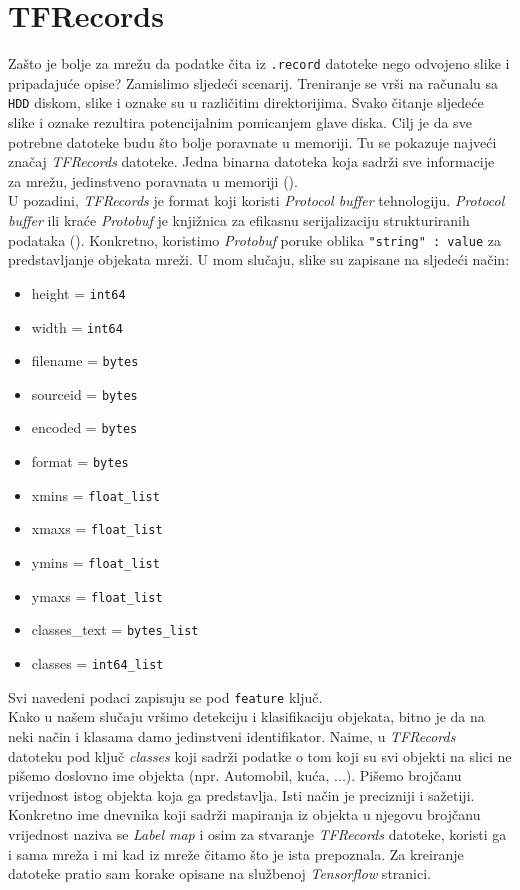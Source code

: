 \section{TFRecords}
Zašto je bolje za mrežu da podatke čita iz \texttt{.record} datoteke nego odvojeno slike i pripadajuće opise?
Zamislimo sljedeći scenarij.
Treniranje se vrši na računalu sa \texttt{HDD} diskom, slike i oznake su u različitim direktorijima.
Svako čitanje sljedeće slike i oznake rezultira potencijalnim pomicanjem glave diska.
Cilj je da sve potrebne datoteke budu što bolje poravnate u memoriji.
Tu se pokazuje najveći značaj \emph{TFRecords} datoteke. 
Jedna binarna datoteka koja sadrži sve informacije za mrežu, jedinstveno poravnata u memoriji (\cite{TFRecords}). \\
U pozadini, \emph{TFRecords} je format koji koristi \emph{Protocol buffer} tehnologiju.
\emph{Protocol buffer} ili kraće \emph{Protobuf} je knjižnica za efikasnu serijalizaciju strukturiranih podataka (\cite{tensorflow.org}).
Konkretno, koristimo \emph{Protobuf} poruke oblika \texttt{"string" : value} za predstavljanje objekata mreži.
U mom slučaju, slike su zapisane na sljedeći način:
\begin{itemize}
\item height = \texttt{int64}
\item width = \texttt{int64}
\item filename = \texttt{bytes}
\item sourceid = \texttt{bytes}
\item encoded = \texttt{bytes}
\item format = \texttt{bytes}
\item xmins = \texttt{float\_list}
\item xmaxs = \texttt{float\_list}
\item ymins = \texttt{float\_list}
\item ymaxs = \texttt{float\_list}
\item classes\_text = \texttt{bytes\_list}
\item classes = \texttt{int64\_list}
\
\end{itemize}
Svi navedeni podaci zapisuju se pod \texttt{feature} ključ. \\
Kako u našem slučaju vršimo detekciju i klasifikaciju objekata, bitno je da na neki način i klasama damo jedinstveni identifikator.
Naime, u \emph{TFRecords} datoteku pod ključ \emph{classes} koji sadrži podatke o tom koji su svi objekti na slici ne pišemo doslovno ime objekta (npr. Automobil, kuća, ...).
Pišemo brojčanu vrijednost istog objekta koja ga predstavlja. 
Isti način je precizniji i sažetiji. \\
Konkretno ime dnevnika koji sadrži mapiranja iz objekta u njegovu brojčanu vrijednost naziva se \emph{Label map} i osim za stvaranje \emph{TFRecords} datoteke, koristi ga i sama mreža i mi kad iz mreže čitamo što je ista prepoznala.
Za kreiranje datoteke pratio sam korake opisane na službenoj \emph{Tensorflow} stranici.
